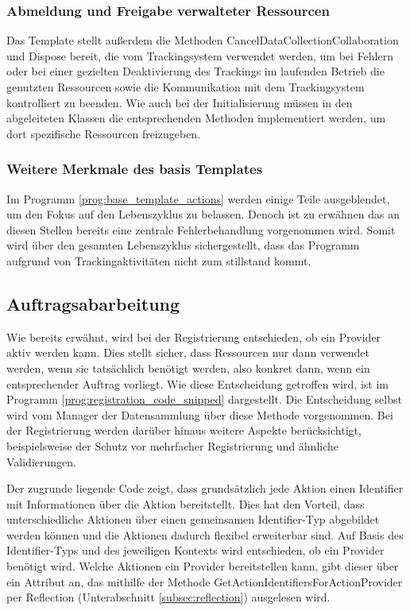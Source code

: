 \subsubsection{Abmeldung und Freigabe verwalteter Ressourcen}
Das Template stellt außerdem die Methoden CancelDataCollectionCollaboration und Dispose bereit, die vom Trackingsystem verwendet werden, um bei Fehlern oder bei einer gezielten Deaktivierung des Trackings im laufenden Betrieb die genutzten Ressourcen sowie die Kommunikation mit dem Trackingsystem kontrolliert zu beenden. Wie auch bei der Initialisierung müssen in den abgeleiteten Klassen die entsprechenden Methoden implementiert werden, um dort spezifische Ressourcen freizugeben.

\subsubsection{Weitere Merkmale des basis Templates}
Im Programm \ref{prog:base_template_actions} werden einige Teile ausgeblendet, um den Fokus auf den Lebenszyklus zu belassen. Denoch ist zu erwähnen das an diesen Stellen bereits eine zentrale Fehlerbehandlung vorgenommen wird. Somit wird über den gesamten Lebenszyklus sichergestellt, dass das Programm aufgrund von Trackingaktivitäten nicht zum stillstand kommt.

\subsection{Auftragsabarbeitung}
Wie bereits erwähnt, wird bei der Registrierung entschieden, ob ein Provider aktiv werden kann. Dies stellt sicher, dass Ressourcen nur dann verwendet werden, wenn sie tatsächlich benötigt werden, also konkret dann, wenn ein entsprechender Auftrag vorliegt. Wie diese Entscheidung getroffen wird, ist im Programm \ref{prog:registration_code_snipped} dargestellt. Die Entscheidung selbst wird vom Manager der Datensammlung über diese Methode vorgenommen. Bei der Registrierung werden darüber hinaus weitere Aspekte berücksichtigt, beispielsweise der Schutz vor mehrfacher Registrierung und ähnliche Validierungen.

Der zugrunde liegende Code zeigt, dass grundsätzlich jede Aktion einen Identifier mit Informationen über die Aktion bereitstellt. Dies hat den Vorteil, dass unterschiedliche Aktionen über einen gemeinsamen Identifier-Typ abgebildet werden können und die Aktionen dadurch flexibel erweiterbar sind. Auf Basis des Identifier-Typs und des jeweiligen Kontexts wird entschieden, ob ein Provider benötigt wird. Welche Aktionen ein Provider bereitstellen kann, gibt dieser über ein Attribut an, das mithilfe der Methode GetActionIdentifiersForActionProvider per Reflection  (Unterabschnitt \ref{subsec:reflection}) ausgelesen wird.

